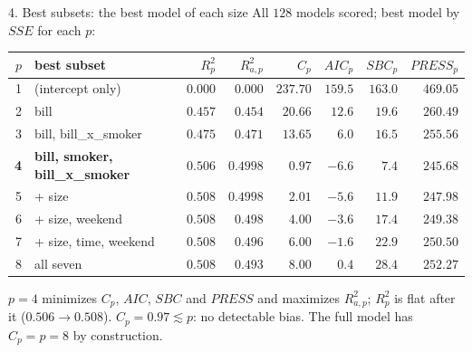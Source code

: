 \documentclass[aspectratio=169,11pt]{beamer}
\begin{document}
\begin{frame}{4. Best subsets: the best model of each size}
  \small
  All $128$ models scored; best model by $SSE$ for each $p$:

  \vspace{0.3em}
  {\scriptsize\setlength{\tabcolsep}{3pt}
  \begin{tabular}{@{}rlrrrrrr@{}}
    \toprule
    $p$ & best subset & $R^2_p$ & $R^2_{a,p}$ & $C_p$ & $AIC_p$ & $SBC_p$ & $PRESS_p$ \\
    \midrule
    1 & (intercept only)                  & $0.000$ & $0.000$ & $237.70$ & $159.5$ & $163.0$ & $469.05$ \\
    2 & bill                              & $0.457$ & $0.454$ & $20.66$  & $12.6$  & $19.6$  & $260.49$ \\
    3 & bill, bill\_x\_smoker             & $0.475$ & $0.471$ & $13.65$  & $6.0$   & $16.5$  & $255.56$ \\
    \textbf{4} & \textbf{bill, smoker, bill\_x\_smoker} & $\mathbf{0.506}$ & $\mathbf{0.4998}$ & $\mathbf{0.97}$ & $\mathbf{-6.6}$ & $\mathbf{7.4}$ & $\mathbf{245.68}$ \\
    5 & + size                            & $0.508$ & $0.4998$ & $2.01$ & $-5.6$ & $11.9$ & $247.98$ \\
    6 & + size, weekend                   & $0.508$ & $0.498$ & $4.00$ & $-3.6$ & $17.4$ & $249.38$ \\
    7 & + size, time, weekend             & $0.508$ & $0.496$ & $6.00$ & $-1.6$ & $22.9$ & $250.50$ \\
    8 & all seven                         & $0.508$ & $0.493$ & $8.00$ & $0.4$  & $28.4$ & $252.27$ \\
    \bottomrule
  \end{tabular}}

  \vspace{0.5em}
  \small
  $p=4$ minimizes $C_p$, $AIC$, $SBC$ and $PRESS$ and maximizes $R^2_{a,p}$;
  $R^2_p$ is flat after it ($0.506\to0.508$). $C_p=0.97\lesssim p$: no detectable bias.
  The full model has $C_p=p=8$ by construction.
\end{frame}
\end{document}
